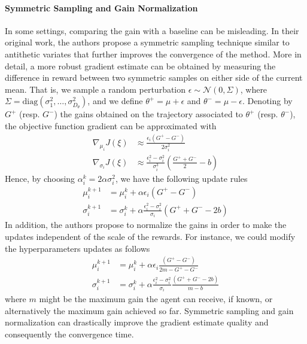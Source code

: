 \paragraph{Symmetric Sampling and Gain Normalization} 
In some settings, comparing the gain with a baseline can be misleading. In
their original work, the authors propose a symmetric sampling technique similar
to antithetic variates that further improves the convergence of the method.
More in detail, a more robust gradient estimate can be obtained by measuring
the difference in reward between two symmetric samples on either side of the
current mean. That is, we sample a random perturbation $\epsilon \sim
\mathcal{N}(0, \Sigma)$, where $\Sigma = \text{diag}(\sigma_1^2, \ldots,
\sigma_{D_\theta}^2)$, and we define $\theta^+ = \mu + \epsilon$ and $\theta^- =
\mu - \epsilon$. Denoting by $G^+$ (resp. $G^-$) the gains obtained on the
trajectory associated to $\theta^+$ (resp. $\theta^-$), the objective function
gradient can be approximated with
\begin{equation}
	\begin{split}
		\nabla_{\mu_i} J(\xi) &\approx \frac{\epsilon_i (G^+ - G^-)}{2
		\sigma_i^2}\\
		\nabla_{\sigma_i} J(\xi) &\approx \frac{\epsilon_i^2 -
	\sigma_i^2}{\sigma_i^3}\left(\frac{G^+ + G^-}{2} - b\right)
	\end{split}
\end{equation}
Hence, by choosing $\alpha_i^k = 2 \alpha \sigma_i^2$, we have the following 
update rules
\begin{equation}
	\begin{split}
		\mu_i^{k+1} &= \mu_i^k + \alpha \epsilon_i (G^+ - G^-)\\
		\sigma_i^{k+1} &= \sigma_i^k + \alpha \frac{\epsilon_i^2 - \sigma_i^2}
		{\sigma_i}\left(G^+ + G^- - 2b\right)
	\end{split}
\end{equation}
In addition, the authors propose to normalize the gains in order to make the
updates independent of the scale of the rewards. For instance, we could modify
the hyperparameters updates as follows
\begin{equation}
	\begin{split}
		\mu_i^{k+1} &= \mu_i^k + \alpha \epsilon_i \frac{(G^+ - G^-)}{2m - G^+
	- G^-}\\
		\sigma_i^{k+1} &= \sigma_i^k + \alpha \frac{\epsilon_i^2 - \sigma_i^2}
	{\sigma_i}\frac{\left(G^+ + G^- - 2b\right)}{m - b}
	\end{split}
\end{equation}
where $m$ might be the maximum gain the agent can receive, if known, or
alternatively the maximum gain achieved so far. Symmetric sampling and gain
normalization can drastically improve the gradient estimate quality and 
consequently the convergence time.  

